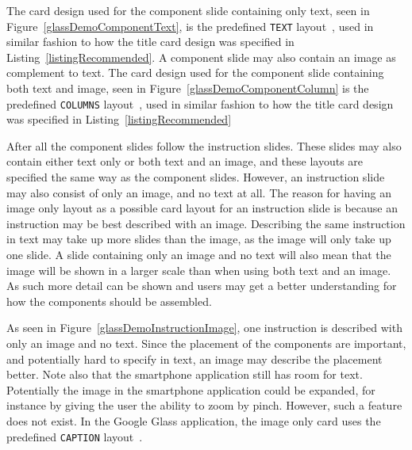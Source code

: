 The card design used for the component slide containing only text, seen in Figure~\ref{glassDemoComponentText}, is the predefined \texttt{TEXT} layout~\cite{cardLayout}, used in similar fashion to how the title card design was specified in Listing~\ref{listingRecommended}. A component slide may also contain an image as complement to text. The card design used for the component slide containing both text and image, seen in Figure~\ref{glassDemoComponentColumn} is the predefined \texttt{COLUMNS} layout~\cite{cardLayout}, used in similar fashion to how the title card design was specified in Listing~\ref{listingRecommended}

After all the component slides follow the instruction slides. These slides may also contain either text only or both text and an image, and these layouts are specified the same way as the component slides. However, an instruction slide may also consist of only an image, and no text at all. The reason for having an image only layout as a possible card layout for an instruction slide is because an instruction may be best described with an image. Describing the same instruction in text may take up more slides than the image, as the image will only take up one slide. A slide containing only an image and no text will also mean that the image will be shown in a larger scale than when using both text and an image. As such more detail can be shown and users may get a better understanding for how the components should be assembled.

As seen in Figure~\ref{glassDemoInstructionImage}, one instruction is described with only an image and no text. Since the placement of the components are important, and potentially hard to specify in text, an image may describe the placement better. Note also that the smartphone application still has room for text. Potentially the image in the smartphone application could be expanded, for instance by giving the user the ability to zoom by pinch. However, such a feature does not exist. In the Google Glass application, the image only card uses the predefined \texttt{CAPTION} layout~\cite{cardLayout}.

